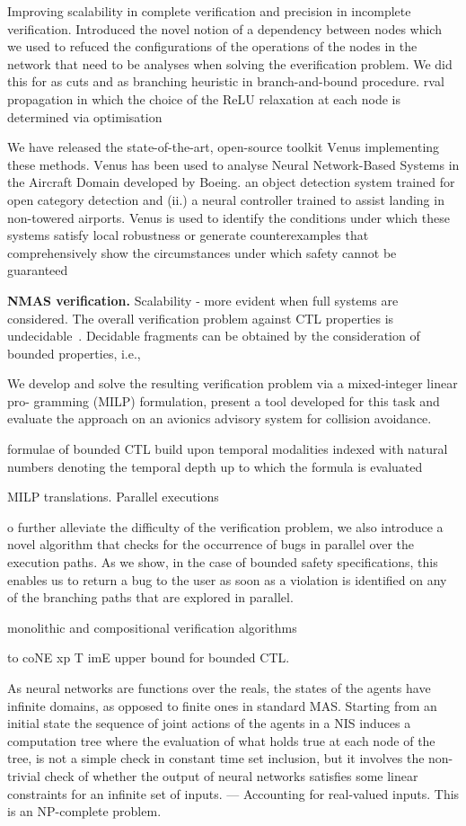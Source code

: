 \documentclass{article}
\begin{document}
Improving scalability in complete verification and precision in incomplete
verification. Introduced the novel notion of a dependency between nodes which we
used to refuced the configurations of the operations of the nodes in the network
that need to be analyses when solving the everification problem. We did this for
as cuts and as branching heuristic in branch-and-bound procedure.  rval
propagation in which the choice of the ReLU relaxation at each node is
determined via optimisation

We have released the state-of-the-art, open-source toolkit {\textsc Venus}
implementing these methods.  {\textsc Venus} has been used to analyse  Neural
Network-Based Systems in the Aircraft Domain developed by Boeing.  an object
detection system trained for open category detection and (ii.) a neural
controller trained to assist landing in non-towered airports. Venus is used to
identify the conditions under which these systems satisfy local robustness or
generate counterexamples that comprehensively show the circumstances under which
safety cannot be guaranteed

{\bf NMAS verification.}
Scalability - more evident when full systems are considered.
The overall verification
problem against CTL properties is undecidable~\cite{Akintunde+22}. Decidable
fragments can be obtained by the consideration of bounded properties, i.e.,

We develop and solve the
resulting verification problem via a mixed-integer linear pro-
gramming (MILP) formulation, present a tool developed for
this task and evaluate the approach on an avionics advisory
system for collision avoidance.

formulae of bounded CTL build
upon temporal modalities indexed with natural numbers denoting
the temporal depth up to which the formula is evaluated

MILP translations. Parallel executions 

o further alleviate the difficulty of the verification problem, we
also introduce a novel algorithm that checks for the occurrence of
bugs in parallel over the execution paths. As we show, in the case
of bounded safety specifications, this enables us to return a bug to
the user as soon as a violation is identified on any of the branching
paths that are explored in parallel.

monolithic and compositional verification algorithms

to coNE xp T imE upper bound for bounded CTL.

As neural networks are functions
over the reals, the states of the agents have infinite domains, as opposed to
finite ones in standard MAS. 
Starting from an initial state the
sequence of joint actions of the agents in a NIS induces a computation tree where 
the evaluation of what holds true at  each node of the tree, is not a simple
check in constant time set inclusion, but it involves the non-trivial check of
whether the output of neural networks satisfies some linear constraints for an
infinite set of inputs.  --- Accounting for real-valued inputs. This is  an
NP-complete problem. 
\end{document}
